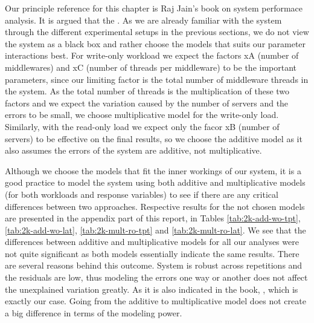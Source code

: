 \documentclass[11pt,a4paper]{article}
\begin{document}
Our principle reference for this chapter is Raj Jain's book \cite{book} on system performace analysis. It is argued that the . As we are already familiar with the system through the different experimental setups in the previous sections, we do not view the system as a black box and rather choose the models that suits our parameter interactions best. For write-only workload we expect the factors xA (number of middlewares) and xC (number of threads per middleware) to be the important parameters, since our limiting factor is the total number of middleware threads in the system. As the total number of threads is the multiplication of these two factors and we expect the variation caused by the number of servers and the errors to be small, we choose multiplicative model for the write-only load. Similarly, with the read-only load we expect only the facor xB (number of servers) to be effective on the final results, so we choose the additive model as it also assumes the errors of the system are additive, not multiplicative.
\par Although we choose the models that fit the inner workings of our system, it is a good practice to model the system using both additive and multiplicative models (for both workloads and response variables) to see if there are any critical differences between two approaches. Respective results for the not chosen models are presented in the appendix part of this report, in Tables \ref{tab:2k-add-wo-tpt}, \ref{tab:2k-add-wo-lat}, \ref{tab:2k-mult-ro-tpt} and \ref{tab:2k-mult-ro-lat}. We see that the differences between additive and multiplicative models for all our analyses were not quite significant as both models essentially indicate the same results. There are several reasons behind this outcome. System is robust across repetitions and the residuals are low, thus modeling the errors one way or another does not affect the unexplained variation greatly. As it is also indicated in the book, , which is exactly our case. Going from the additive to multiplicative model does not create a big difference in terms of the modeling power.
\end{document}
